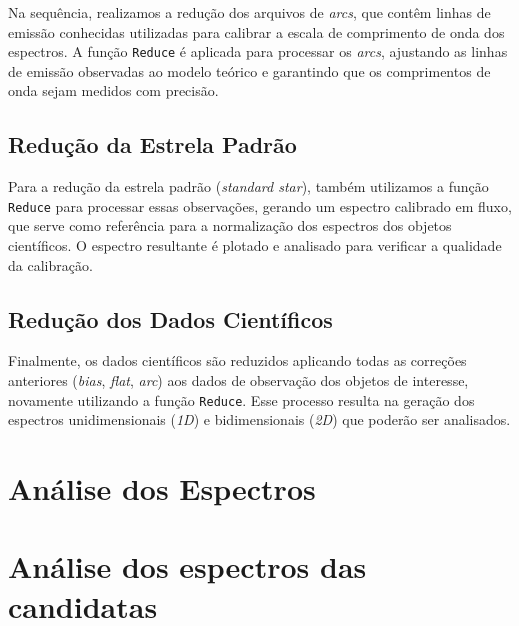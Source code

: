 Na sequência, realizamos a redução dos arquivos de \textit{arcs}, que contêm linhas de emissão conhecidas utilizadas para calibrar a escala de comprimento de onda dos espectros. A função \verb|Reduce| é aplicada para processar os \textit{arcs}, ajustando as linhas de emissão observadas ao modelo teórico e garantindo que os comprimentos de onda sejam medidos com precisão.

\subsection*{Redução da Estrela Padrão}

Para a redução da estrela padrão (\textit{standard star}), também utilizamos a função \verb|Reduce| para processar essas observações, gerando um espectro calibrado em fluxo, que serve como referência para a normalização dos espectros dos objetos científicos. O espectro resultante é plotado e analisado para verificar a qualidade da calibração.

\subsection*{Redução dos Dados Científicos}

Finalmente, os dados científicos são reduzidos aplicando todas as correções anteriores (\textit{bias}, \textit{flat}, \textit{arc}) aos dados de observação dos objetos de interesse, novamente utilizando a função \verb|Reduce|. Esse processo resulta na geração dos espectros unidimensionais (\textit{1D}) e bidimensionais (\textit{2D}) que poderão ser analisados.

\section{Análise dos Espectros}

\section{Análise dos espectros das candidatas}



